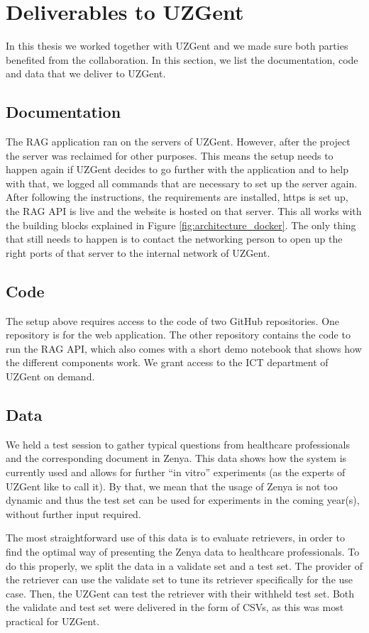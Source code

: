 \chapter{Deliverables to UZGent}

In this thesis we worked together with UZGent and we made sure both parties benefited from the collaboration. In this section, we list the documentation, code and data that we deliver to UZGent.

\section{Documentation}
The RAG application ran on the servers of UZGent. However, after the project the server was reclaimed for other purposes. This means the setup needs to happen again if UZGent decides to go further with the application and to help with that, we logged all commands that are necessary to set up the server again. After following the instructions, the requirements are installed, https is set up, the RAG API is live and the website is hosted on that server. This all works with the building blocks explained in Figure \ref{fig:architecture_docker}. The only thing that still needs to happen is to contact the networking person to open up the right ports of that server to the internal network of UZGent.

\section{Code}
The setup above requires access to the code of two GitHub repositories. One repository is for the web application. The other repository contains the code to run the RAG API, which also comes with a short demo notebook that shows how the different components work. We grant access to the ICT department of UZGent on demand. 

\section{Data}
We held a test session to gather typical questions from healthcare professionals and the corresponding document in Zenya. This data shows how the system is currently used and allows for further ``in vitro'' experiments (as the experts of UZGent like to call it). By that, we mean that the usage of Zenya is not too dynamic and thus the test set can be used for experiments in the coming year(s), without further input required.

The most straightforward use of this data is to evaluate retrievers, in order to find the optimal way of presenting the Zenya data to healthcare professionals. To do this properly, we split the data in a validate set and a test set. The provider of the retriever can use the validate set to tune its retriever specifically for the use case. Then, the UZGent can test the retriever with their withheld test set. Both the validate and test set were delivered in the form of CSVs, as this was most practical for UZGent.

